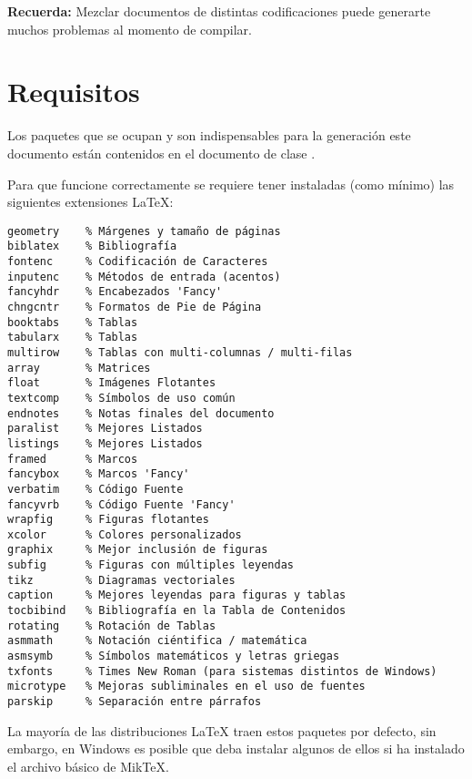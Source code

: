 \vspace{10mm}
\begin{framed}
    \textbf{Recuerda:} Mezclar documentos de distintas codificaciones puede generarte muchos problemas al momento de compilar.  
\end{framed}

\newpage
\section{Requisitos}
Los paquetes que se ocupan y son indispensables para la generación este documento están contenidos en el documento de clase .

Para que funcione correctamente se requiere tener instaladas (como mínimo) las siguientes extensiones \LaTeX{}:
\begin{Verbatim}[frame=lines, label=Paquetes requeridos por \inlinecode{thesis_utfsm.sty}
				, fontsize=\footnotesize
				, baselinestretch=1
				, formatcom=\color{gray}]
geometry    % Márgenes y tamaño de páginas
biblatex    % Bibliografía
fontenc     % Codificación de Caracteres
inputenc    % Métodos de entrada (acentos)
fancyhdr    % Encabezados 'Fancy'
chngcntr    % Formatos de Pie de Página
booktabs    % Tablas
tabularx    % Tablas
multirow    % Tablas con multi-columnas / multi-filas
array       % Matrices
float       % Imágenes Flotantes
textcomp    % Símbolos de uso común
endnotes    % Notas finales del documento
paralist    % Mejores Listados
listings    % Mejores Listados
framed      % Marcos
fancybox    % Marcos 'Fancy'
verbatim    % Código Fuente
fancyvrb    % Código Fuente 'Fancy'
wrapfig     % Figuras flotantes
xcolor      % Colores personalizados
graphix     % Mejor inclusión de figuras
subfig      % Figuras con múltiples leyendas
tikz        % Diagramas vectoriales
caption     % Mejores leyendas para figuras y tablas
tocbibind   % Bibliografía en la Tabla de Contenidos
rotating    % Rotación de Tablas
asmmath     % Notación ciéntifica / matemática
asmsymb     % Símbolos matemáticos y letras griegas
txfonts     % Times New Roman (para sistemas distintos de Windows)
microtype   % Mejoras subliminales en el uso de fuentes
parskip     % Separación entre párrafos
\end{Verbatim}

La mayoría de las distribuciones \LaTeX{} traen estos paquetes por defecto, sin embargo, en Windows es posible que deba instalar algunos de ellos si ha instalado el archivo básico de MikTeX.


\newpage
